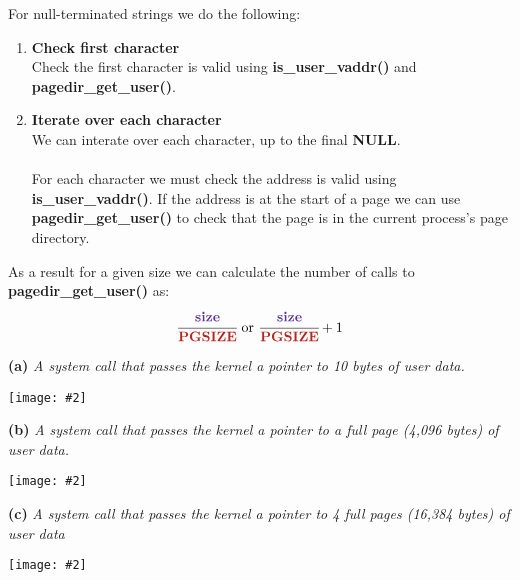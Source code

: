 \documentclass{report}
\newcommand{\question}[1]{\textit{#1} \ }
\newcommand{\bullpara}[2]{\item \textbf{#1} \ #2}
\newcommand{\fun}[1]{\textcolor{Emerald}{\textbf{#1}}}
\newcommand{\var}[1]{\textcolor{RoyalPurple}{\textbf{#1}}}
\newcommand{\const}[1]{\textcolor{BrickRed}{\textbf{#1}}}
\newcommand{\centerimage}[2]{\begin{center}
    \texttt{[image: \#2]}
\end{center}}
\begin{document}
                For null-terminated strings we do the following:
                \begin{enumerate}
                    \bullpara{Check first character}{
                        \\ Check the first character is valid using \fun{is\_user\_vaddr()} and \fun{pagedir\_get\_user()}.
                    }
                    \bullpara{Iterate over each character}{
                        \\ We can interate over each character, up to the final \const{NULL}.
                        \\
                        \\ For each character we must check the address is valid using \fun{is\_user\_vaddr()}. If the address
                         is at the start of a page we can use \fun{pagedir\_get\_user()} to check that the page is in the current process's page directory.
                    }
                \end{enumerate}
                
                As a result for a given size we can calculate the number of calls to \fun{pagedir\_get\_user()} as:
                \[\cfrac{\text{\var{size}}}{\text{\const{PGSIZE}}} \text{ or } \cfrac{\text{\var{size}}}{\text{\const{PGSIZE}}} + 1\]

                \textbf{(a)}
                \question{A system call that passes the kernel a pointer to 10 bytes of user data.}
                \centerimage{width=0.8\textwidth}{B3 part a.png}

                \textbf{(b)}
                \question{A system call that passes the kernel a pointer to a full page (4,096 bytes) of user data.}
                \centerimage{width=0.8\textwidth}{B3 part b.png}

                \textbf{(c)}
                \question{A system call that passes the kernel a pointer to 4 full pages (16,384 bytes) of user data}
                \centerimage{width=0.8\textwidth}{B3 part c.png}
            
\end{document}
